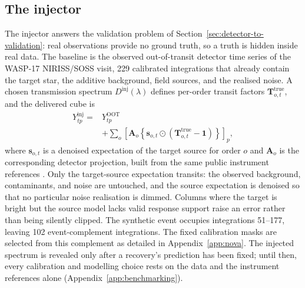 \subsection{The injector}


The injector answers the validation problem of
Section~\ref{sec:detector-to-validation}: real observations provide no
ground truth, so a truth is hidden inside real data. The baseline is the
observed out-of-transit detector time series of the WASP-17 NIRISS/SOSS
visit, 229 calibrated integrations that already contain the target star,
the additive background, field sources, and the realised noise. A chosen
transmission spectrum $D^{\mathrm{inj}}(\lambda)$ defines per-order
transit factors $\bm{T}^{\mathrm{true}}_{o,t}$, and the delivered cube is
\begin{equation}
\begin{split}
 Y^{\mathrm{inj}}_{tp}
 = {}& Y^{\mathrm{OOT}}_{tp} \\
 & + \sum_{o}\left[\bm{A}_o\!\left\{\bm{s}_{o,t}\odot
   \left(\bm{T}^{\mathrm{true}}_{o,t}-\bm{1}\right)\right\}\right]_p ,
\end{split}
 \label{eq:v45-injector}
\end{equation}
where $\bm{s}_{o,t}$ is a denoised expectation of the target source for
order $o$ and $\bm{A}_o$ is the corresponding detector projection, built
from the same public instrument references
\citep{BainesEtAl2023Trace,BainesEtAl2023Wavelength,DarveauBernierEtAl2022}.
Only the target-source expectation transits: the observed background,
contaminants, and noise are untouched, and the source expectation is
denoised so that no particular noise realisation is dimmed. Columns where
the target is bright but the source model lacks valid response support
raise an error rather than being silently clipped. The synthetic event
occupies integrations 51--177, leaving 102 event-complement integrations.
The fixed calibration masks are selected from this complement as detailed
in Appendix~\ref{app:nova}. The injected spectrum is revealed
only after a recovery's prediction has been fixed; until then, every
calibration and modelling choice rests on the data and the instrument
references alone (Appendix~\ref{app:benchmarking}).

